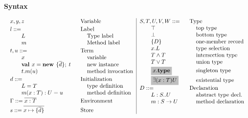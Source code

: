 
{\bf Syntax}\medskip
    
$\ba{l@{\hspace{0.2mm}}|@{\hspace{0.2mm}}l}
\ba[t]{l@{\hspace{10mm}}l}
x, y, z    & \lindent{\mbox{Variable}} \\[0.2em]
l ::=      & \lindent{\mbox{Label}} \\
\gap L     & \mbox{Type label}\\
\gap m     & \mbox{Method label}\\[0.2em]
t, u ::=      & \lindent{\mbox{Term}} \\
\gap x     & \mbox{variable} \\
\gap \trmnew x {\seq{d}} t & \mbox{new instance} \\
\gap \trmcall t m u & \mbox{method invocation} \\[0.2em]
d ::= & \lindent{\mbox{Initialization}} \\
\gap \deftyp L T        & \mbox{type definition}\\
\gap \defmtd m x T U u  & \mbox{method definition}\\[0.2em]
\Gamma ::= \seq{x \typ T} & \lindent\mbox{Environment} \\[0.2em]
s      ::= \seq{x \mapsto \{\seq{d}\}} & \lindent\mbox{Store} \\
\ea
&

\ba[t]{l@{\hspace{10mm}}l}
S,T,U,V,W ::= & \lindent\mbox{Type}\\
\gap \Top  & \mbox{top type} \\
\gap \Bot  & \mbox{bottom type} \\
\gap \{D\} & \mbox{one-member record} \\
\gap x.L & \mbox{type selection} \\
\gap T \tand T & \mbox{intersection type} \\
\gap T \tor T  & \mbox{union type} \\[0.2em]
\gap \highlight{$x\sing$}    & \mbox{singleton type} \\[0.3em]
\gap \highlight{$\exTyp x T U$} & \mbox{existential type} \\
D ::= & \lindent\mbox{Declaration} \\
\gap \Ldecl {L} S U & \mbox{abstract type decl.} \\
\gap \mdecl m S U & \mbox{method declaration}
\ea
\ea$
